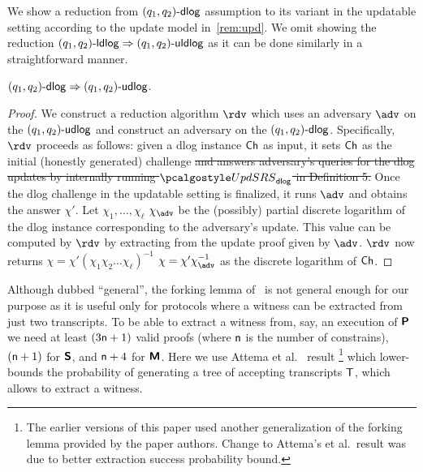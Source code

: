 {

We show a reduction from $(q_1, q_2)\text{-}\mathsf{dlog}$ assumption to its variant in the updatable setting according to the update model in~\cref{rem:upd}. We omit showing the reduction $(q_1, q_2)\text{-}\mathsf{ldlog} \Rightarrow (q_1, q_2)\text{-}\mathsf{uldlog}$ as it can be done similarly in a straightforward manner.
\begin{lemma}
	$(q_1, q_2)\text{-}\mathsf{dlog} \Rightarrow (q_1, q_2)\text{-}\mathsf{udlog}$.
	\end{lemma}
\begin{proof}
	We construct a reduction algorithm $\reduction$ which uses an adversary $\adv$ on the $(q_1, q_2)\text{-}\mathsf{udlog}$ and construct an adversary on the $(q_1, q_2)\text{-}\mathsf{dlog}$. Specifically, $\reduction$ proceeds as follows: given a dlog instance $\mathsf{Ch}$ as input, it sets $\mathsf{Ch}$ as the initial (honestly generated) challenge \sout{and answers adversary's queries for the dlog updates by internally running $\upd_{\dlog}$ in Definition 5.} Once the dlog challenge in the updatable setting is finalized, it runs $\adv$ and obtains the answer $\chi'$. Let \sout{$\chi_1, \ldots, \chi_\ell$} $\chi_\adv$ be the (possibly) partial discrete logarithm of the dlog instance corresponding to the adversary's update. This value can be computed by $\reduction$ by extracting from the update proof given by $\adv$. $\reduction$ now returns  
	\sout{$\chi = \chi' (\chi_1 \chi_2 \ldots \chi_\ell)^{-1}$} $\chi = \chi' \chi_\adv^{-1}$ as the discrete logarithm of $\mathsf{Ch}$. %
	\end{proof}
}

Although dubbed ``general'', the forking lemma of~\cite{CCS:BelNev06} is not general enough for our purpose as it is useful only for protocols where a witness can be extracted from just two transcripts. To be able to extract a witness from, say, an execution of $\bm{\mathsf{P}}$ we need at least $(3 \mathsf{n} + 1)$ valid proofs (where $\mathsf{n}$ is the number of constrains), $(\mathsf{n}+ 1)$ for $\bm{\mathsf{S}}$, and $\mathsf{n} + 4$ for $\bm{\mathsf{M}}$. Here we use Attema et
al.~\cite{EPRINT:AttFehKlo21} result \footnote{The earlier versions of this paper used another generalization of the forking lemma provided by the paper authors. Change to Attema's et al.~result was due to better extraction success probability bound.}  which lower-bounds the probability of generating a tree of accepting transcripts $\mathsf{T}$, which allows to extract a witness.

